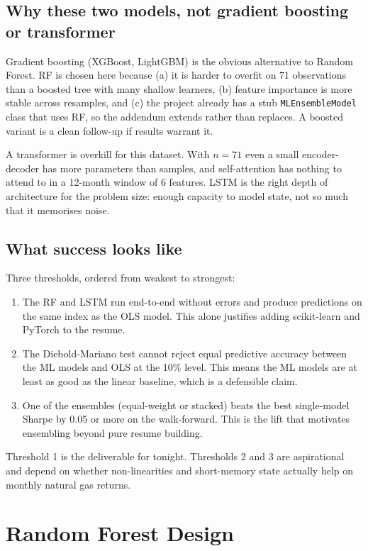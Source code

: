 \documentclass[11pt,letterpaper]{article}
\begin{document}
\subsection{Why these two models, not gradient boosting or transformer}

Gradient boosting (XGBoost, LightGBM) is the obvious alternative to Random Forest. RF is chosen here because (a) it is harder to overfit on 71 observations than a boosted tree with many shallow learners, (b) feature importance is more stable across resamples, and (c) the project already has a stub \texttt{MLEnsembleModel} class that uses RF, so the addendum extends rather than replaces. A boosted variant is a clean follow-up if results warrant it.

A transformer is overkill for this dataset. With $n=71$ even a small encoder-decoder has more parameters than samples, and self-attention has nothing to attend to in a 12-month window of 6 features. LSTM is the right depth of architecture for the problem size: enough capacity to model state, not so much that it memorises noise.

\subsection{What success looks like}

Three thresholds, ordered from weakest to strongest:

\begin{enumerate}[leftmargin=*,nosep]
  \item The RF and LSTM run end-to-end without errors and produce predictions on the same index as the OLS model. This alone justifies adding scikit-learn and PyTorch to the resume.
  \item The Diebold-Mariano test cannot reject equal predictive accuracy between the ML models and OLS at the 10\% level. This means the ML models are at least as good as the linear baseline, which is a defensible claim.
  \item One of the ensembles (equal-weight or stacked) beats the best single-model Sharpe by 0.05 or more on the walk-forward. This is the lift that motivates ensembling beyond pure resume building.
\end{enumerate}

Threshold 1 is the deliverable for tonight. Thresholds 2 and 3 are aspirational and depend on whether non-linearities and short-memory state actually help on monthly natural gas returns.

\section{Random Forest Design}
\end{document}
